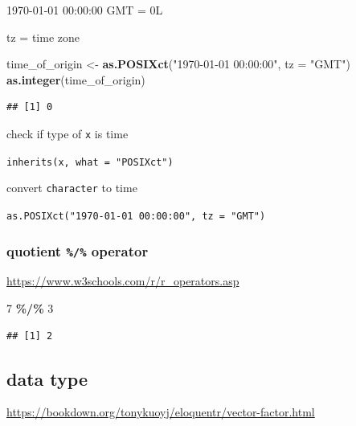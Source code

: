 \documentclass[
]{book}
\newenvironment{Shaded}{\begin{snugshade}}{\end{snugshade}}
\newcommand{\AttributeTok}[1]{\textcolor[rgb]{0.13,0.29,0.53}{#1}}
\newcommand{\DecValTok}[1]{\textcolor[rgb]{0.00,0.00,0.81}{#1}}
\newcommand{\FunctionTok}[1]{\textcolor[rgb]{0.13,0.29,0.53}{\textbf{#1}}}
\newcommand{\NormalTok}[1]{#1}
\newcommand{\OtherTok}[1]{\textcolor[rgb]{0.56,0.35,0.01}{#1}}
\newcommand{\SpecialCharTok}[1]{\textcolor[rgb]{0.81,0.36,0.00}{\textbf{#1}}}
\newcommand{\StringTok}[1]{\textcolor[rgb]{0.31,0.60,0.02}{#1}}
\theoremstyle{definition}
\theoremstyle{definition}
\theoremstyle{definition}
\theoremstyle{definition}
\theoremstyle{remark}
\begin{document}
1970-01-01 00:00:00 GMT = 0L

tz = time zone

\begin{Shaded}
\begin{Highlighting}[]
\NormalTok{time\_of\_origin }\OtherTok{\textless{}{-}} \FunctionTok{as.POSIXct}\NormalTok{(}\StringTok{"1970{-}01{-}01 00:00:00"}\NormalTok{, }\AttributeTok{tz =} \StringTok{"GMT"}\NormalTok{)}
\FunctionTok{as.integer}\NormalTok{(time\_of\_origin)}
\end{Highlighting}
\end{Shaded}

\begin{verbatim}
## [1] 0
\end{verbatim}

check if type of \texttt{x} is time

\texttt{inherits(x,\ what\ =\ "POSIXct")}

convert \texttt{character} to time

\texttt{as.POSIXct("1970-01-01\ 00:00:00",\ tz\ =\ "GMT")}

\hypertarget{quotient-operator}{%
\subsubsection{\texorpdfstring{quotient \texttt{\%/\%} operator}{quotient \%/\% operator}}\label{quotient-operator}}

\url{https://www.w3schools.com/r/r_operators.asp}

\begin{Shaded}
\begin{Highlighting}[]
\DecValTok{7} \SpecialCharTok{\%/\%} \DecValTok{3}
\end{Highlighting}
\end{Shaded}

\begin{verbatim}
## [1] 2
\end{verbatim}

\hypertarget{data-type}{%
\subsection{data type}\label{data-type}}

\url{https://bookdown.org/tonykuoyj/eloquentr/vector-factor.html}
\end{document}
